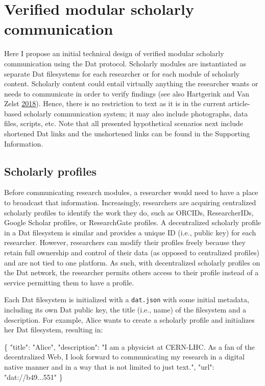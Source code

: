 \documentclass[a5paper]{book}
\newenvironment{Shaded}{\begin{snugshade}}{\end{snugshade}}
\newcommand{\DataTypeTok}[1]{\textcolor[rgb]{0.13,0.29,0.53}{#1}}
\newcommand{\StringTok}[1]{\textcolor[rgb]{0.31,0.60,0.02}{#1}}
\newcommand{\FunctionTok}[1]{\textcolor[rgb]{0.00,0.00,0.00}{#1}}
\begin{document}
\section{Verified modular scholarly
communication}\label{verified-modular-scholarly-communication}

Here I propose an initial technical design of verified modular scholarly
communication using the Dat protocol. Scholarly modules are instantiated
as separate Dat filesystems for each researcher or for each module of
scholarly content. Scholarly content could entail virtually anything the
researcher wants or needs to communicate in order to verify findings
(see also Hartgerink and Van Zelst
\protect\hyperlink{ref-doi:10.3390ux2fpublications6020021}{2018}).
Hence, there is no restriction to text as it is in the current
article-based scholarly communication system; it may also include
photographs, data files, scripts, etc. Note that all presented
hypothetical scenarios next include shortened Dat links and the
unshortened links can be found in the Supporting Information.

\subsection{Scholarly profiles}\label{scholarly-profiles}

Before communicating research modules, a researcher would need to have a
place to broadcast that information. Increasingly, researchers are
acquiring centralized scholarly profiles to identify the work they do,
such as ORCIDs, ResearcherIDs, Google Scholar profiles, or ResearchGate
profiles. A decentralized scholarly profile in a Dat filesystem is
similar and provides a unique ID (i.e., public key) for each researcher.
However, researchers can modify their profiles freely because they
retain full ownership and control of their data (as opposed to
centralized profiles) and are not tied to one platform. As such, with
decentralized scholarly profiles on the Dat network, the researcher
permits others access to their profile instead of a service permitting
them to have a profile.

Each Dat filesystem is initialized with a \texttt{dat.json} with some
initial metadata, including its own Dat public key, the title (i.e.,
name) of the filesystem and a description. For example, Alice wants to
create a scholarly profile and initializes her Dat filesystem, resulting
in:

\begin{Shaded}
\begin{Highlighting}[]
\FunctionTok{\{}
  \DataTypeTok{"title"}\FunctionTok{:} \StringTok{"Alice"}\FunctionTok{,}
  \DataTypeTok{"description"}\FunctionTok{:} \StringTok{"I am a physicist at CERN-LHC. As a fan of the }
\StringTok{    decentralized Web, I look forward to communicating my research}
\StringTok{    in a digital native manner and in a way that is not limited }
\StringTok{    to just text."}\FunctionTok{,}
  \DataTypeTok{"url"}\FunctionTok{:} \StringTok{"dat://b49...551"}
\FunctionTok{\}}
\end{Highlighting}
\end{Shaded}
\end{document}
